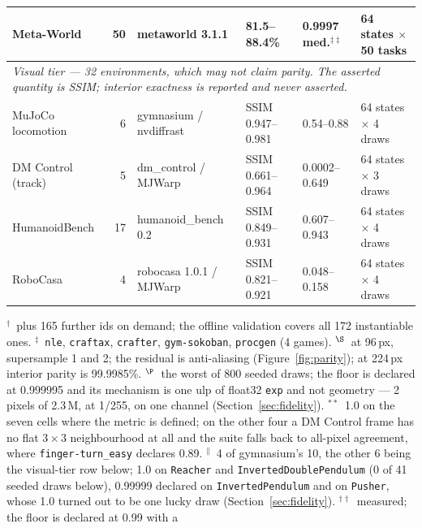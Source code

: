 \documentclass{article}
\begin{document}
\begin{table}[t]
\begin{tabular}{lrllll}
Meta-World           & 50 & metaworld 3.1.1          & 81.5--88.4\% & 0.9997 med.$^{\ddagger\ddagger}$ & 64 states $\times$ 50 tasks \\
\midrule
\multicolumn{6}{l}{\emph{Visual tier --- 32 environments, which may not claim parity. The asserted quantity is SSIM; interior exactness is reported and never asserted.}}\\
\midrule
MuJoCo locomotion    & 6  & gymnasium / nvdiffrast   & SSIM 0.947--0.981 & 0.54--0.88 & 64 states $\times$ 4 draws \\
DM Control (track)   & 5  & dm\_control / MJWarp     & SSIM 0.661--0.964 & 0.0002--0.649 & 64 states $\times$ 3 draws \\
HumanoidBench        & 17 & humanoid\_bench 0.2      & SSIM 0.849--0.931 & 0.607--0.943 & 64 states $\times$ 4 draws \\
RoboCasa             & 4  & robocasa 1.0.1 / MJWarp  & SSIM 0.821--0.921 & 0.048--0.158 & 64 states $\times$ 4 draws \\
\bottomrule
\end{tabular}
\vskip 0.04in
{\scriptsize $^{\dagger}$~plus 165 further ids on demand; the offline
validation covers all 172 instantiable ones. $^{\ddagger}$~\texttt{nle},
\texttt{craftax}, \texttt{crafter}, \texttt{gym-sokoban}, \texttt{procgen}
(4 games). $^{\S}$~at 96\,px, supersample 1 and 2; the residual is
anti-aliasing (Figure~\ref{fig:parity}); at 224\,px interior parity is
99.9985\%. $^{\P}$~the worst of 800 seeded draws; the floor is declared at 0.999995 and
its mechanism is one ulp of float32 \texttt{exp} and not geometry --- 2 pixels
of 2.3\,M, at 1/255, on one channel (Section~\ref{sec:fidelity}).
$^{**}$~1.0 on the seven cells where the metric is defined; on the other four
a DM Control frame has no flat $3\times3$ neighbourhood at all and the suite
falls back to all-pixel agreement, where \texttt{finger-turn\_easy} declares
0.89. $^{\|}$~4 of gymnasium's 10, the other 6 being the visual-tier row
below; 1.0 on \texttt{Reacher} and \texttt{InvertedDoublePendulum} (0 of 41
seeded draws below), 0.99999 declared on \texttt{InvertedPendulum} and on
\texttt{Pusher}, whose 1.0 turned out to be one lucky draw
(Section~\ref{sec:fidelity}). $^{\dagger\dagger}$~measured; the floor is declared at 0.99 with a
}
\end{table}
\end{document}
